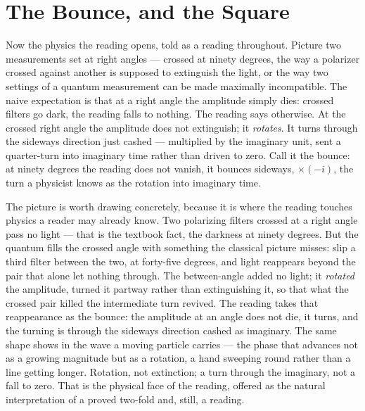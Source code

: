\section{The Bounce, and the Square}

Now the physics the reading opens, told as a reading throughout. Picture two measurements set at right angles ---
crossed at ninety degrees, the way a polarizer crossed against another is supposed to extinguish the light, or the
way two settings of a quantum measurement can be made maximally incompatible. The naive expectation is that at a
right angle the amplitude simply dies: crossed filters go dark, the reading falls to nothing. The reading says
otherwise. At the crossed right angle the amplitude does not extinguish; it \emph{rotates}. It turns through
the sideways direction just cashed --- multiplied by the imaginary unit, sent a quarter-turn into imaginary time
rather than driven to zero. Call it the bounce: at ninety degrees the reading does not vanish, it
bounces sideways, $\times(-i)$, the turn a physicist knows as the rotation into imaginary time.

The picture is worth drawing concretely, because it is where the reading touches physics a reader may already
know. Two polarizing filters crossed at a right angle pass no light --- that is the textbook fact, the darkness at
ninety degrees. But the quantum fills the crossed angle with something the classical picture misses: slip a third
filter between the two, at forty-five degrees, and light reappears beyond the pair that alone let nothing through.
The between-angle added no light; it \emph{rotated} the amplitude, turned it partway rather than extinguishing it,
so that what the crossed pair killed the intermediate turn revived. The reading takes that reappearance as the
bounce: the amplitude at an angle does not die, it turns, and the turning is through the sideways direction
cashed as imaginary. The same shape shows in the wave a moving particle carries --- the phase that
advances not as a growing magnitude but as a rotation, a hand sweeping round rather than a line getting longer.
Rotation, not extinction; a turn through the imaginary, not a fall to zero. That is the physical face of the
reading, offered as the natural interpretation of a proved two-fold and, still, a reading.

